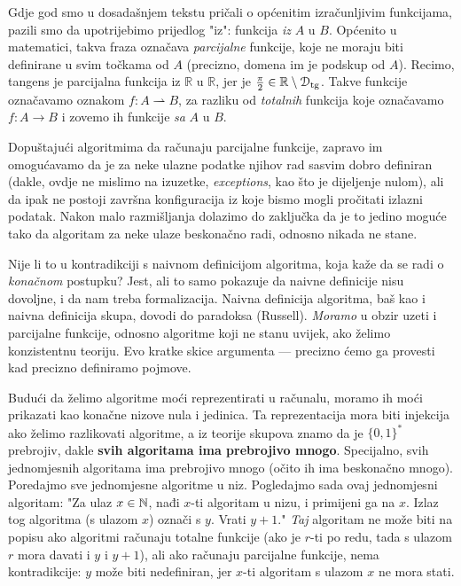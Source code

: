 Gdje god smo u dosadašnjem tekstu pričali o općenitim izračunljivim funkcijama, pazili smo da  upotrijebimo prijedlog "iz": funkcija \emph{iz} $A$ u $B$. Općenito u matematici, takva fraza označava \emph{parcijalne} funkcije, koje ne moraju biti definirane u svim točkama od $A$ (precizno, domena im je podskup od $A$). Recimo, tangens je parcijalna funkcija iz $\mathbb R$ u $\mathbb R$, jer je $\frac{\pi}{2}\in\mathbb R\setminus \mathcal D_{\text{tg}}$. Takve funkcije označavamo oznakom $f:A\rightharpoonup B$, za razliku od \emph{totalnih} funkcija koje označavamo $f:A\to B$ i zovemo ih funkcije \emph{sa} $A$ u $B$. 

Dopuštajući algoritmima da računaju parcijalne funkcije, zapravo im omogućavamo da je za neke ulazne podatke njihov rad sasvim dobro definiran (dakle, ovdje ne mislimo na izuzetke, \emph{exceptions}, kao što je dijeljenje nulom), ali da ipak ne postoji završna konfiguracija iz koje bismo mogli pročitati izlazni podatak. Nakon malo razmišljanja dolazimo do zaključka da je to jedino moguće tako da algoritam za neke ulaze beskonačno radi, odnosno nikada ne stane.

Nije li to u kontradikciji s naivnom definicijom algoritma, koja kaže da se radi o \emph{konačnom} postupku? Jest, ali to samo pokazuje da naivne definicije nisu dovoljne, i da nam treba formalizacija. Naivna definicija algoritma, baš kao i naivna definicija skupa, dovodi do paradoksa (Russell). \emph{Moramo} u obzir uzeti i parcijalne funkcije, odnosno algoritme koji ne stanu uvijek, ako želimo konzistentnu teoriju. Evo kratke skice argumenta --- precizno ćemo ga provesti kad precizno definiramo pojmove.

Budući da želimo algoritme moći reprezentirati u računalu, moramo ih moći prikazati kao konačne nizove nula i jedinica. Ta reprezentacija mora biti injekcija ako želimo razlikovati algoritme, a iz teorije skupova znamo da je $\{0,1\}^*$ prebrojiv, dakle \textbf{svih algoritama ima prebrojivo mnogo}. Specijalno, svih jednomjesnih algoritama ima prebrojivo mnogo (očito ih ima beskonačno mnogo). Poredajmo sve jednomjesne algoritme u niz. Pogledajmo sada ovaj jednomjesni algoritam: "Za ulaz $x\in{\mathbb N}$, nađi $x$-ti algoritam u nizu, i primijeni ga na $x$. Izlaz tog algoritma (s ulazom $x$) označi s $y$. Vrati $y+1$." \emph{Taj} algoritam ne može biti na popisu ako algoritmi računaju totalne funkcije (ako je $r$-ti po redu, tada s ulazom $r$ mora davati i $y$ i $y+1$), ali ako računaju parcijalne funkcije, nema kontradikcije: $y$ može biti nedefiniran, jer $x$-ti algoritam s ulazom $x$ ne mora stati.

